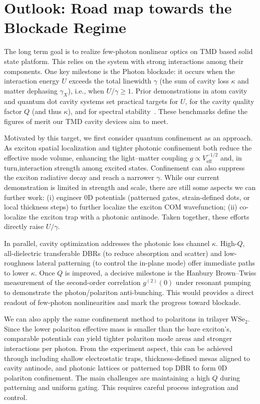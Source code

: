 \section{Outlook: Road map towards the Blockade Regime}
The long term goal is to realize few-photon nonlinear optics on TMD based solid state platform.
This relies on the system with strong interactions among their components.
One key milestone is the Photon blockade: it occurs when the interaction energy $U$ exceeds the total linewidth $\gamma$ (the sum of cavity loss $\kappa$ and matter dephasing $\gamma_{X}$), i.e., when $U/\gamma \geq 1$. 
Prior demonstrations in atom cavity and quantum dot cavity systems set practical targets for $U$, for the cavity quality factor $Q$ (and thus $\kappa$), and for spectral stability~\cite{Birnbaum2005-ix,Faraon2008-vr}. 
These benchmarks define the figures of merit our TMD cavity devices aim to meet.

Motivated by this target, we first consider quantum confinement as an approach. 
As exciton spatial localization and tighter photonic confinement both reduce the effective mode volume, enhancing the light–matter coupling $g \propto V_\mathrm{eff}^{-1/2}$ and, in turn,interaction strength among excited states. 
Confinement can also suppress the exciton radiative decay and reach a narrower $\gamma$. 
While our current demonstration is limited in strength and scale, there are still some aspects we can further work: (i) engineer 0D potentials (patterned gates, strain-defined dots, or local thickness steps) to further localize the exciton COM wavefunction; 
(ii) co-localize the exciton trap with a photonic antinode.
Taken together, these efforts directly raise $U/\gamma$.

In parallel, cavity optimization addresses the photonic loss channel $\kappa$. 
High-$Q$, all-dielectric transferable DBRs (to reduce absorption and scatter) and low-roughness lateral patterning (to control the in-plane mode) offer immediate paths to lower $\kappa$. 
Once $Q$ is improved, a decisive milestone is the Hanbury Brown–Twiss measurement of the second-order correlation $g^{(2)}(0)$ under resonant pumping to demonstrate the photon/polariton anti-bunching. 
This would provides a direct readout of few-photon nonlinearities and mark the progress toward blockade.

We can also apply the same confinement method to polaritons in trilayer WSe$_2$. 
Since the lower polariton effective mass is smaller than the bare exciton’s, comparable potentials can yield tighter polariton mode areas and stronger interactions per photon. 
From the experiment aspect, this can be achieved through including shallow electrostatic traps, thickness-defined mesas aligned to cavity antinode, and photonic lattices or patterned top DBR to form 0D polariton confinement. 
The main challenges are maintaining a high $Q$ during patterning and uniform gating. This requires careful process integration and control.

